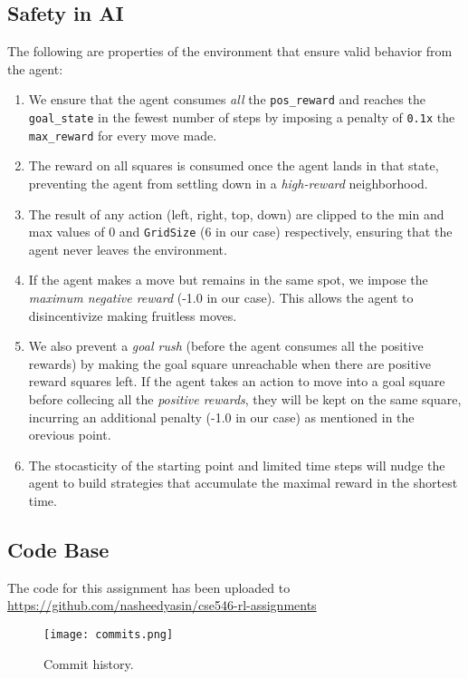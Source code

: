 \documentclass{article} %
\begin{document}
\subsection{Safety in AI}
The following are properties of the environment that ensure valid behavior from the agent:

\begin{enumerate}
    \item We ensure that the agent consumes \textit{all} the \verb|pos_reward| and reaches
        the \verb|goal_state| in the fewest number of steps by imposing a penalty of \verb|0.1x|
        the \verb|max_reward| for every move made.
    \item The reward on all squares is consumed once the agent lands in that state, preventing 
    the agent from settling down in a \textit{high-reward} neighborhood.
    \item The result of any action (left, right, top, down) are clipped to the min and max
        values of 0 and \verb|GridSize| (6 in our case) respectively, ensuring that the
        agent never leaves the environment.
    \item If the agent makes a move but remains in the same spot, we impose the \textit{maximum negative
        reward} (-1.0 in our case). This allows the agent to disincentivize making fruitless
        moves.
    \item We also prevent a \textit{goal rush} (before the agent consumes all the positive
        rewards) by making the goal square unreachable when there are positive reward squares
        left. If the agent takes an action to move into a goal square before collecing all the
        \textit{positive rewards}, they will be kept on the same square, incurring an additional
        penalty (-1.0 in our case) as mentioned in the orevious point.
    \item The stocasticity of the starting point and limited time steps will nudge the agent
        to build strategies that accumulate the maximal reward in the shortest time.
\end{enumerate}

\subsection*{Code Base}
The code for this assignment has been uploaded to \url{https://github.com/nasheedyasin/cse546-rl-assignments}

\begin{figure}[h]
    \begin{center}
        \texttt{[image: commits.png]}
    \end{center}
    \caption{Commit history.}
\end{figure}

\printbibliography
\end{document}
